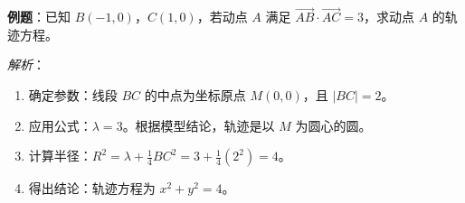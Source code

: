 \begin{examplebox}
\textbf{例题}：已知 $B(-1,0)$，$C(1,0)$，若动点 $A$ 满足 $\vec{AB} \cdot \vec{AC} = 3$，求动点 $A$ 的轨迹方程。

\textit{解析}：
\begin{enumerate}
    \item 确定参数：线段 $BC$ 的中点为坐标原点 $M(0,0)$，且 $|BC| = 2$。
    \item 应用公式：$\lambda = 3$。根据模型结论，轨迹是以 $M$ 为圆心的圆。
    \item 计算半径：$R^2 = \lambda + \frac{1}{4}BC^2 = 3 + \frac{1}{4}(2^2) = 4$。
    \item 得出结论：轨迹方程为 $x^2 + y^2 = 4$。
\end{enumerate}
\end{examplebox}